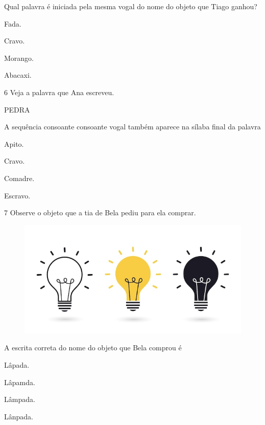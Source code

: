 Qual palavra é iniciada pela mesma vogal do nome do objeto que Tiago ganhou?

\begin{escolha}
\item Fada.

\item Cravo.

\item Morango.

\item Abacaxi.
\end{escolha}

\num{6} Veja a palavra que Ana escreveu.

\begin{myquote}
PEDRA
\end{myquote}

A sequência consoante consoante vogal também aparece na sílaba final da palavra

\begin{escolha}
\item Apito.

\item Cravo.

\item Comadre.

\item Escravo.
\end{escolha}

\pagebreak
\num{7} Observe o objeto que a tia de Bela pediu para ela comprar.

\begin{figure}[htpb!]
\centering
\includegraphics[width=.5\textwidth]{media/image178.jpeg}
\end{figure}


A escrita correta do nome do objeto que Bela comprou é

\begin{escolha}
\item Lâpada.

\item Lâpamda.

\item Lâmpada.

\item Lânpada.
\end{escolha}

